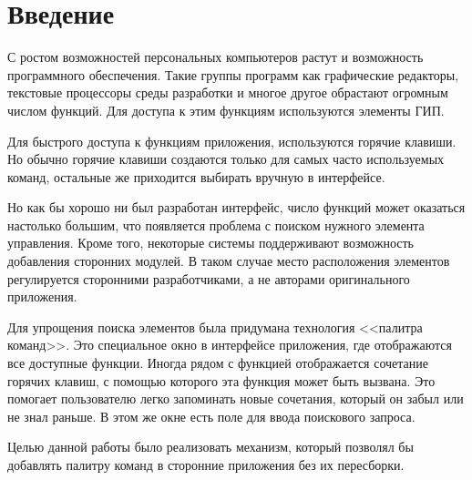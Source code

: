 \chapter*{Введение}

С ростом возможностей персональных компьютеров растут и возможность программного
обеспечения. Такие группы программ как графические редакторы, текстовые
процессоры среды разработки и многое другое обрастают огромным числом функций.
Для доступа к этим функциям используются элементы ГИП.

Для быстрого доступа к функциям приложения, используются горячие клавиши. Но
обычно горячие клавиши создаются только для самых часто используемых команд,
остальные же приходится выбирать вручную в интерфейсе.

Но как бы хорошо ни был разработан интерфейс, число функций может оказаться
настолько большим, что появляется проблема с поиском нужного элемента
управления. Кроме того, некоторые системы поддерживают возможность добавления
сторонних модулей. В таком случае место расположения элементов регулируется
сторонними разработчиками, а не авторами оригинального приложения.

Для упрощения поиска элементов была придумана технология <<палитра команд>>. Это
специальное окно в интерфейсе приложения, где отображаются все доступные
функции.
Иногда рядом с функцией отображается сочетание горячих клавиш, с помощью
которого эта функция может быть вызвана. Это помогает пользователю легко
запоминать новые сочетания, который он забыл или не знал раньше.
В этом же окне есть поле для ввода поискового запроса.

Целью данной работы было реализовать механизм, который позволял бы добавлять
палитру команд в сторонние приложения без их пересборки.
